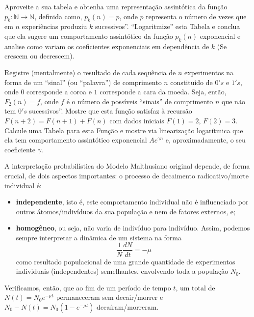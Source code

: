 \begin{exercise}
    Aproveite a sua tabela e obtenha uma representação assintótica da função \(p_k: \mathbb{N} \to \mathbb{N}\), definida como, \(p_k(n) = p\), onde \(p\) representa o número de vezes que em \(n\) experiências produziu \(k\) sucessivos''. ``Logaritmize'' esta Tabela e conclua que ela sugere um comportamento assintótico da função \(p_k(n)\) exponencial e analise como variam os coeficientes exponenciais em dependência de \(k\) (Se crescem ou decrescem).
\end{exercise}

\begin{exercise}
    Registre (mentalmente) o resultado de cada sequência de \(n\) experimentos na forma de um ``sinal'' (ou ``palavra'') de comprimento \(n\) constituído de \(0's\) e \(1's\), onde \(0\) corresponde a coroa e \(1\) corresponde a cara da moeda. Seja, então, \(F_2(n) = f\), onde \(f\) é o número de possíveis ``sinais'' de comprimento \(n\) que não tem \(0's\) sucessivos''. Mostre que esta função satisfaz à recursão \(F(n+2) = F(n+1) + F(n)\) com dados iniciais \(F(1) = 2\), \(F(2) = 3\). Calcule uma Tabela para esta Função e mostre via linearização logarítmica que ela tem comportamento assintótico exponencial \(Ae^{\gamma n}\) e, aproximadamente, o seu coeficiente \(\gamma\).
\end{exercise}

    A interpretação probabilística do Modelo Malthusiano original depende, de forma crucial, de dois aspectos importantes: o processo de decaimento radioativo/morte individual é:
    \begin{itemize}
    \item \textbf{independente}, isto é, este comportamento individual não é influenciado por outros átomos/indivíduos da sua população e nem de fatores externos, e;
    \item \textbf{homogêneo}, ou seja, não varia de indivíduo para indivíduo. Assim, podemos sempre interpretar a dinâmica de um sistema na forma
    \[\dfrac{1}{N} \dfrac{dN}{dt} = -\mu\]
    como resultado populacional de uma grande quantidade de experimentos individuais (independentes) semelhantes, envolvendo toda a população \(N_0\).
    \end{itemize}
    
    Verificamos, então, que ao fim de um período de tempo \(t\), um total de \(N(t) = N_0e^{-\mu t}\) permaneceram sem decair/morrer e \(N_0 - N(t) = N_0(1-e^{-\mu t})\) decaíram/morreram.

